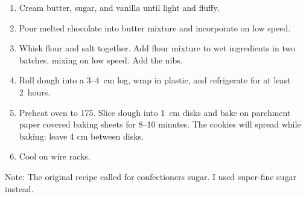 
\begin{ingredients}
\end{ingredients}


\begin{recipe}
  \begin{enumerate}

  \item Cream butter, sugar, and vanilla until light and fluffy.

  \item Pour melted chocolate into butter mixture and incorporate on
    low speed.

  \item Whisk flour and salt together.  Add flour mixture to wet
    ingredients in two batches, mixing on low speed.  Add the nibs.

  \item Roll dough into a 3--4~cm log, wrap in plastic, and
    refrigerate for at least 2~hours.

  \item Preheat oven to 175\degreeC.  Slice dough into 1~cm disks and
    bake on parchment paper covered baking sheets for 8--10 minutes.
    The cookies will spread while baking: leave 4 cm between disks.

  \item Cool on wire racks.

  \end{enumerate}
\end{recipe}

Note: The original recipe called for confectioners sugar.  I used
super-fine sugar instead.

